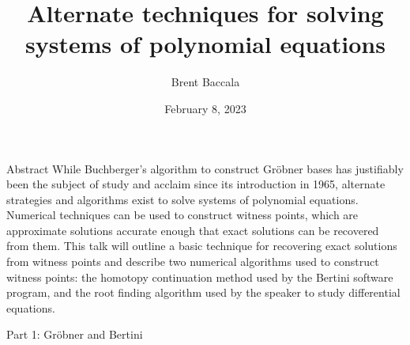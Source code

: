 \documentclass{beamer}
\title{Alternate techniques for solving systems of polynomial equations}
\author{Brent Baccala}
\institute{\tt cosine@freesoft.org}
\date{February 8, 2023}
\begin{document}
\begin{frame}
\titlepage
\begin{block}{Abstract}
\tiny
While Buchberger's algorithm to construct Gr\"obner bases has justifiably been the subject of study and acclaim since its introduction in 1965, alternate strategies and algorithms exist to solve systems of polynomial equations.  Numerical techniques can be used to construct witness points, which are approximate solutions accurate enough that exact solutions can be recovered from them.  This talk will outline a basic technique for recovering exact solutions from witness points and describe two numerical algorithms used to construct witness points: the homotopy continuation method used by the Bertini software program, and the root finding algorithm used by the speaker to study differential equations.
\end{block}
\end{frame}

\begin{frame}
\begin{exampleblock}{}
\begin{center}
\vskip 20pt
\Huge
Part 1: Gr\"obner and Bertini
\vskip 6pt
\ 
\end{center}
\end{exampleblock}
\end{frame}
\end{document}
